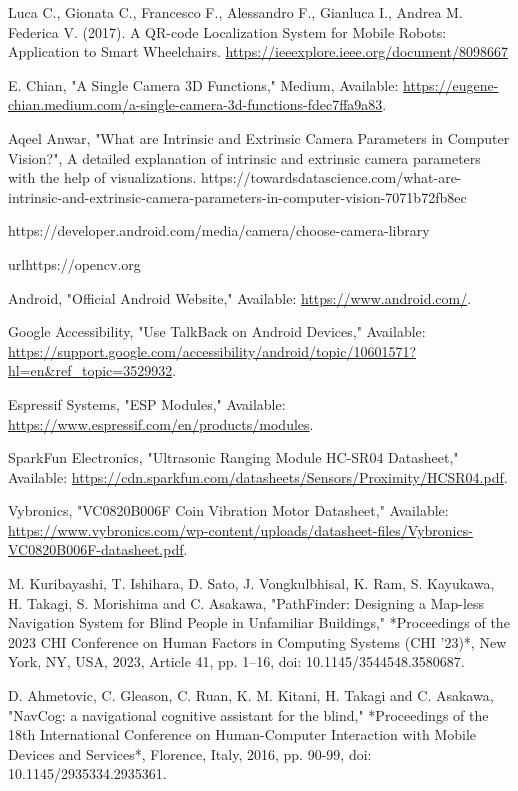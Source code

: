 \begin{thebibliography}{9}
	Luca C., Gionata C., Francesco F., Alessandro F., Gianluca I., Andrea M. Federica V. (2017). A QR-code Localization System for Mobile Robots: Application to Smart Wheelchairs.
	\url{https://ieeexplore.ieee.org/document/8098667}
	
	E. Chian, "A Single Camera 3D Functions," Medium, Available: \url{https://eugene-chian.medium.com/a-single-camera-3d-functions-fdec7ffa9a83}.
	
	Aqeel Anwar, "What are Intrinsic and Extrinsic Camera Parameters in Computer Vision?", A detailed explanation of intrinsic and extrinsic camera parameters with the help of visualizations.
	https://towardsdatascience.com/what-are-intrinsic-and-extrinsic-camera-parameters-in-computer-vision-7071b72fb8ec
	
	https://developer.android.com/media/camera/choose-camera-library
	
	url{https://opencv.org}
	
	Android, "Official Android Website," Available:
	\url{https://www.android.com/}.
	
	Google Accessibility, "Use TalkBack on Android Devices," Available: \url{https://support.google.com/accessibility/android/topic/10601571?hl=en&ref_topic=3529932}.
	
	Espressif Systems, "ESP Modules," Available: \url{https://www.espressif.com/en/products/modules}.
	
	SparkFun Electronics, "Ultrasonic Ranging Module HC-SR04 Datasheet," 
	Available: \url{https://cdn.sparkfun.com/datasheets/Sensors/Proximity/HCSR04.pdf}.
	
	Vybronics, "VC0820B006F Coin Vibration Motor Datasheet," 
	Available: \url{https://www.vybronics.com/wp-content/uploads/datasheet-files/Vybronics-VC0820B006F-datasheet.pdf}.
	
	M. Kuribayashi, T. Ishihara, D. Sato, J. Vongkulbhisal, K. Ram, S. Kayukawa, H. Takagi, S. Morishima and C. Asakawa, "PathFinder: Designing a Map-less Navigation System for Blind People in Unfamiliar Buildings," *Proceedings of the 2023 CHI Conference on Human Factors in Computing Systems (CHI '23)*, New York, NY, USA, 2023, Article 41, pp. 1–16, doi: 10.1145/3544548.3580687.
	
	D. Ahmetovic, C. Gleason, C. Ruan, K. M. Kitani, H. Takagi and C. Asakawa, "NavCog: a navigational cognitive assistant for the blind," *Proceedings of the 18th International Conference on Human-Computer Interaction with Mobile Devices and Services*, Florence, Italy, 2016, pp. 90-99, doi: 10.1145/2935334.2935361.
	

\end{thebibliography}
